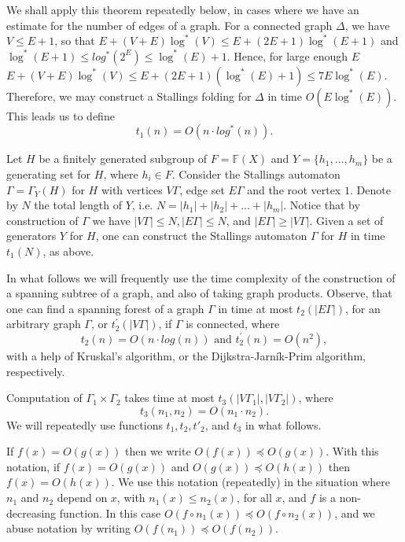 \documentclass[a4paper,12pt]{article}
\newcommand{\G}{\Gamma }
\newcommand{\D}{\Delta }
\numberwithin{equation}{section}
\numberwithin{figure}{section}
\newcommand{\FF}{\ensuremath{\mathbb{F}}}
\begin{document}
We shall apply this theorem repeatedly below, in cases where we
have an estimate for the number of edges of a graph. For a
connected graph $\D$, we have $V\le E+1$, so that
$E+(V+E)\log^*(V)\le E+(2E+1)\log^*(E+1)$ and $\log^*(E+1)\le
log^*(2^E)\le \log^*(E)+1$. Hence, for large enough $E$
$E+(V+E)\log^*(V)\le E+(2E+1)(\log^*(E)+1)\le 7E\log^*(E)$.
Therefore, we may construct a Stallings folding for $\D$ in time
$O(E\log^*(E))$. This leads us to define
\begin{equation}\label{t1} t_1(n) = O (n \cdot log^{\ast}(n)).
\end{equation}

Let $H$ be a finitely generated subgroup of $F=\FF(X)$ and
$Y=\{h_1,\ldots ,h_m\}$ be a generating set for $H$, where $h_i\in
F$. Consider the Stallings automaton $\G = \G_Y(H)$ for $H$ with
vertices $V\G$, edge set $E\G$ and the root vertex $1$. Denote by
$N$ the total length of $Y$, i.e. $N = |h_1| + |h_2| + \ldots +
|h_m|$. Notice that by construction of $\G$ we have $|V\G| \le N,
|E\G| \le N$, and $|E \G| \ge |V \G|$.
Given a set of generators $Y$ for $H$, one can construct the
Stallings automaton $\G$ for $H$ in time $t_1(N)$, as above.

In what follows we will  frequently  use the time complexity of the
 construction of a spanning subtree of a graph, and also of taking graph
products.
Observe, that one can find a spanning forest of a graph $\G$ in
time at most $t_2(|E\G|)$, for an arbitrary graph $\G$,
or $t^{\prime}_2(|V\G|)$, if $\G$ is  connected, where
\begin{equation}\label{t2}
t_2(n) = O(n \cdot log(n)) {\textrm{ and }} t^{\prime}_2(n) =
O(n^2),
\end{equation}
with a help of Kruskal's algorithm, or
the Dijkstra-Jarn\'{i}k-Prim  algorithm, respectively.

Computation of $\G_1 \times \G_2$ takes time at most $t_3(|V\G_1|,
|V\G_2|)$, where
\begin{equation}\label{t3}
t_3(n_1, n_2) = O(n_1 \cdot n_2).
\end{equation}
We will repeatedly use  functions $t_1, t_2, t'_2$,
and $t_3$ in what follows.

If $f(x)=O(g(x))$ then we write $O(f(x))\preceq O(g(x))$. With
this notation, if $f(x)=O(g(x))$ and $O(g(x))\preceq O(h(x))$ then
$f(x)=O(h(x))$.  We use this notation (repeatedly) in the situation
where $n_1$ and $n_2$ depend on $x$, with $n_1(x)\le n_2(x)$, for all $x$,
and $f$ is a non-decreasing function. In this case
$O(f\circ n_1(x))\preceq O(f\circ n_2(x))$, and we abuse notation by
writing $O(f(n_1)) \preceq O(f(n_2))$.
\end{document}
